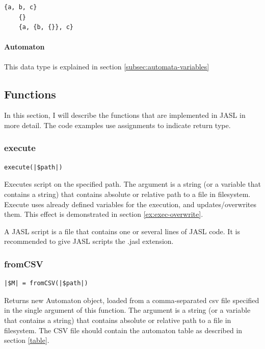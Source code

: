 \documentclass{ctuthesis}
\begin{document}
\begin{minipage}{\linewidth}
\begin{lstlisting}[language = JASL_snippet]
	{a, b, c}
	{}
	{a, {b, {}}, c}
\end{lstlisting}
\end{minipage}

\paragraph{Automaton}
This data type is explained in section \ref{subsec:automata-variables}

\subsection{Functions}
\label{sec:functions}
In this section, I will describe the functions that are implemented in JASL in more detail. The code examples use assignments to indicate return type.

\subsubsection{execute}
\label{subsec:execute}
\begin{lstlisting}[language = JASL_snippet]
	execute(|$path|)
\end{lstlisting}

Executes script on the specified path. The argument is a string (or a variable that contains a string) that contains absolute or relative path to a file in filesystem. Execute uses already defined variables for the execution, and updates/overwrites them. This effect is demonstrated in section \ref{ex:exec-overwrite}.

A JASL script is a file that contains one or several lines of JASL code. It is recommended to give JASL scripts the .jasl extension.

\subsubsection{fromCSV}
\begin{lstlisting}[language = JASL_snippet]
	|$M| = fromCSV(|$path|)
\end{lstlisting}

Returns new Automaton object, loaded from a comma-separated csv file specified in the single argument of this function. The argument is a string (or a variable that contains a string) that contains absolute or relative path to a file in filesystem. The CSV file should contain the automaton table as described in section \ref{table}.
\end{document}
